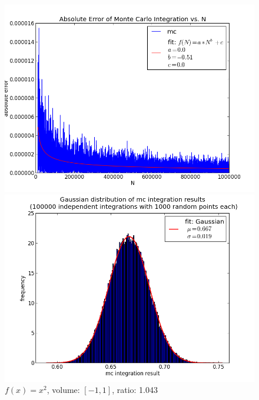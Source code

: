 \documentclass[12pt,a4paper,titlepage]{article}
\begin{document}
\begin{figure}
	\centering
	\caption{$f(x)=x^2$, volume: $[-1,1]$, ratio: 1.043}
	\begin{minipage}[b]{\linewidth}
		\centering
		\includegraphics[width=\linewidth]{Plots/quadratisch}
	\end{minipage}
	\begin{minipage}[b]{\linewidth}
		\centering
		\includegraphics[width=\linewidth]{Plots/histQuadratisch}
	\end{minipage}
	\label{fig:linear}
\end{figure}
\end{document}
